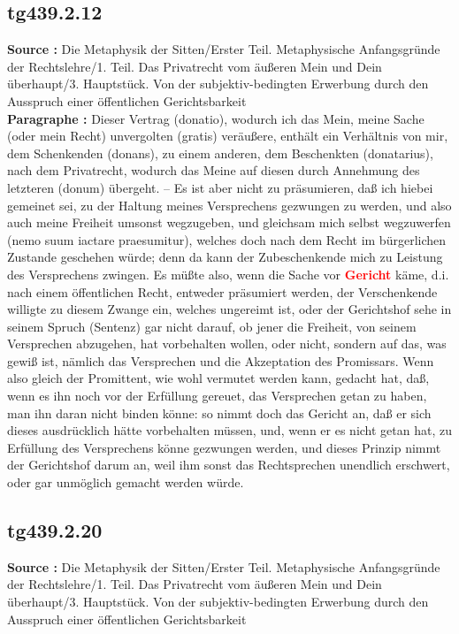 \documentclass[a4paper,12pt,twoside]{book}
\newcommand{\match}[1]{\textcolor{red}{\textbf{#1}}}
\begin{document}
	\subsection*{tg439.2.12} 
	\textbf{Source : }Die Metaphysik der Sitten/Erster Teil. Metaphysische Anfangsgründe der Rechtslehre/1. Teil. Das Privatrecht vom äußeren Mein und Dein überhaupt/3. Hauptstück. Von der subjektiv-bedingten Erwerbung durch den Ausspruch einer öffentlichen Gerichtsbarkeit\\  
	
	\textbf{Paragraphe : }Dieser Vertrag (donatio), wodurch ich das Mein, meine Sache (oder mein Recht) unvergolten (gratis) veräußere, enthält ein Verhältnis von mir, dem Schenkenden (donans), zu einem anderen, dem Beschenkten (donatarius), nach dem Privatrecht, wodurch das Meine auf diesen durch Annehmung des letzteren (donum) übergeht. – Es ist aber nicht zu präsumieren, daß ich hiebei gemeinet sei, zu der Haltung meines Versprechens gezwungen zu werden, und also auch meine Freiheit umsonst wegzugeben, und gleichsam mich selbst wegzuwerfen (nemo suum iactare praesumitur), welches doch nach dem Recht im bürgerlichen Zustande geschehen würde; denn da kann der Zubeschenkende mich zu Leistung des Versprechens zwingen. Es müßte also, wenn die Sache vor \match{Gericht} käme, d.i. nach einem öffentlichen Recht, entweder präsumiert werden, der  Verschenkende willigte zu diesem Zwange ein, welches ungereimt ist, oder der Gerichtshof sehe in seinem Spruch (Sentenz) gar nicht darauf, ob jener die Freiheit, von seinem Versprechen abzugehen, hat vorbehalten wollen, oder nicht, sondern auf das, was gewiß ist, nämlich das Versprechen und die Akzeptation des Promissars. Wenn also gleich der Promittent, wie wohl vermutet werden kann, gedacht hat, daß, wenn es ihn noch vor der Erfüllung gereuet, das Versprechen getan zu haben, man ihn daran nicht binden könne: so nimmt doch das Gericht an, daß er sich dieses ausdrücklich hätte vorbehalten müssen, und, wenn er es nicht getan hat, zu Erfüllung des Versprechens könne gezwungen werden, und dieses Prinzip nimmt der Gerichtshof darum an, weil ihm sonst das Rechtsprechen unendlich erschwert, oder gar unmöglich gemacht werden würde. 
	
	\subsection*{tg439.2.20} 
	\textbf{Source : }Die Metaphysik der Sitten/Erster Teil. Metaphysische Anfangsgründe der Rechtslehre/1. Teil. Das Privatrecht vom äußeren Mein und Dein überhaupt/3. Hauptstück. Von der subjektiv-bedingten Erwerbung durch den Ausspruch einer öffentlichen Gerichtsbarkeit\\  
	
\end{document}
